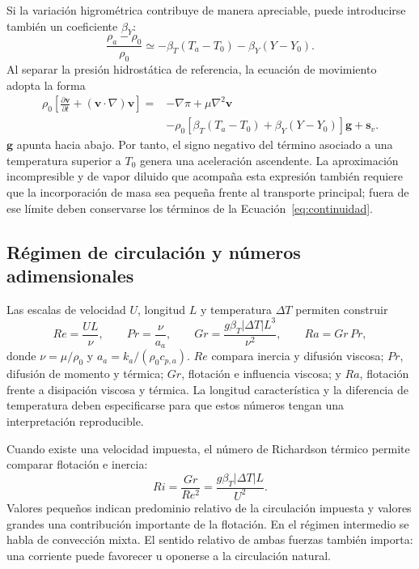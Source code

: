 Si la variación higrométrica contribuye de manera apreciable, puede introducirse también un coeficiente $\beta_Y$:
\begin{equation}
\frac{\rho_a-\rho_0}{\rho_0}
\simeq-\beta_T(T_a-T_0)-\beta_Y(Y-Y_0).
\label{eq:boussinesq_termohigrometrico}
\end{equation}
Al separar la presión hidrostática de referencia, la ecuación de movimiento adopta la forma
\begin{equation}
\begin{aligned}
\rho_0\left[\frac{\partial\mathbf v}{\partial t}
+(\mathbf v\cdot\nabla)\mathbf v\right]
={}&-\nabla\pi+\mu\nabla^2\mathbf v\\
&-\rho_0[\beta_T(T_a-T_0)+\beta_Y(Y-Y_0)]\mathbf g+\mathbf s_v.
\end{aligned}
\label{eq:movimiento_boussinesq}
\end{equation}
$\mathbf g$ apunta hacia abajo. Por tanto, el signo negativo del término asociado a una temperatura superior a $T_0$ genera una aceleración ascendente. La aproximación incompresible y de vapor diluido que acompaña esta expresión también requiere que la incorporación de masa sea pequeña frente al transporte principal; fuera de ese límite deben conservarse los términos de la Ecuación~\eqref{eq:continuidad}.



\subsection{Régimen de circulación y números adimensionales}

Las escalas de velocidad $U$, longitud $L$ y temperatura $\Delta T$ permiten construir
\begin{equation}
Re=\frac{UL}{\nu},
\qquad
Pr=\frac{\nu}{a_a},
\qquad
Gr=\frac{g\beta_T|\Delta T|L^3}{\nu^2},
\qquad
Ra=Gr\,Pr,
\label{eq:adimensionales_flujo}
\end{equation}
donde $\nu=\mu/\rho_0$ y $a_a=k_a/(\rho_0c_{p,a})$. $Re$ compara inercia y difusión viscosa; $Pr$, difusión de momento y térmica; $Gr$, flotación e influencia viscosa; y $Ra$, flotación frente a disipación viscosa y térmica. La longitud característica y la diferencia de temperatura deben especificarse para que estos números tengan una interpretación reproducible.

Cuando existe una velocidad impuesta, el número de Richardson térmico permite comparar flotación e inercia:
\begin{equation}
Ri=\frac{Gr}{Re^2}=\frac{g\beta_T|\Delta T|L}{U^2}.
\label{eq:richardson}
\end{equation}
Valores pequeños indican predominio relativo de la circulación impuesta y valores grandes una contribución importante de la flotación. En el régimen intermedio se habla de convección mixta. El sentido relativo de ambas fuerzas también importa: una corriente puede favorecer u oponerse a la circulación natural.

